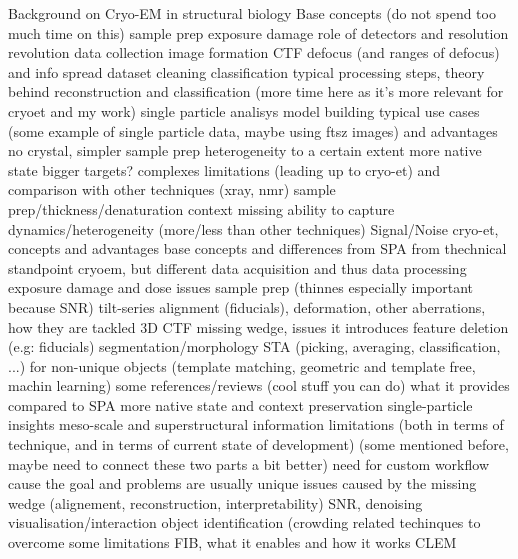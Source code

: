 \begin{outline}
\1 Background on Cryo-EM in structural biology
    \2 Base concepts (do not spend too much time on this)
        \3 \tick sample prep
        \3 \tick exposure damage
        \3 \tick role of detectors and resolution revolution \cite{faruqiCCDDetectorsHighresolution2000}
        \3 \tick data collection
        \3 image formation
        \3 CTF
        \3 defocus (and ranges of defocus) and info spread
        \3 dataset cleaning
        \3 classification
        \3 typical processing steps, theory behind reconstruction and classification (more time here as it's more relevant for cryoet and my work)
        \3 single particle analisys
        \3 model building
    \2 typical use cases (some example of single particle data, maybe using ftsz images) and advantages
        \3 no crystal, simpler sample prep
        \3 heterogeneity to a certain extent
        \3 more native state
        \3 bigger targets? complexes
    \2 limitations (leading up to cryo-et) and comparison with other techniques (xray, nmr)
        \3 sample prep/thickness/denaturation
        \3 context missing
        \3 ability to capture dynamics/heterogeneity (more/less than other techniques)
        \3 Signal/Noise
\1 cryo-et, concepts and advantages
    \2 base concepts and differences from SPA from thechnical standpoint
        \2 cryoem, but different data acquisition and thus data processing
        \3 exposure damage and dose issues
        \3 sample prep (thinnes especially important because SNR)
        \3 tilt-series alignment (fiducials), deformation, other aberrations, how they are tackled
        \3 3D CTF
        \3 missing wedge, issues it introduces
        \3 feature deletion (e.g: fiducials)
        \3 segmentation/morphology
        \3 STA (picking, averaging, classification, ...) for non-unique objects (template matching, geometric and template free, machin learning)
    \2 some references/reviews (cool stuff you can do)
        \3 \cite{turkPromiseChallengesCryoelectron2020,lucicCryoelectronTomographyChallenge2013}
    \2 what it provides compared to SPA
        \3 more native state and context preservation
        \3 single-particle insights
        \3 meso-scale and superstructural information
    \2 limitations (both in terms of technique, and in terms of current state of development)
        \3 (some mentioned before, maybe need to connect these two parts a bit better)
        \3 need for custom workflow cause the goal and problems are usually unique
        \3 issues caused by the missing wedge (alignement, reconstruction, interpretability)
        \3 SNR, denoising
        \3 visualisation/interaction
        \3 object identification (crowding
    \2 related techinques to overcome some limitations
        \3 FIB, what it enables and how it works
        \2 CLEM
\end{outline}


